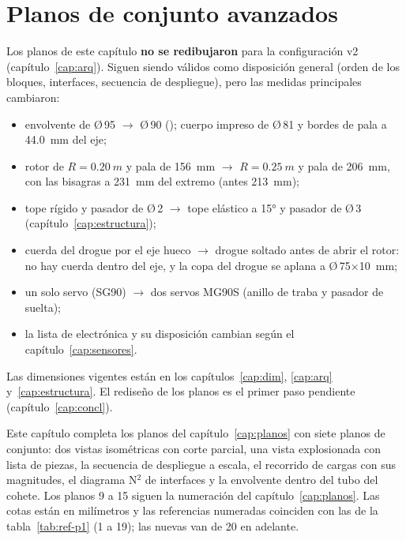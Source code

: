 \chapter{Planos de conjunto avanzados}\label{cap:planos-conjunto}

\begin{nota}
Los planos de este capítulo \textbf{no se redibujaron} para la configuración v2 (capítulo~\ref{cap:arq}). Siguen
siendo válidos como disposición general (orden de los bloques, interfaces, secuencia de
despliegue), pero las medidas principales cambiaron:
\begin{itemize}[leftmargin=*,nosep]
  \item envolvente de Ø\,95 $\to$ Ø\,90 (); cuerpo impreso de Ø\,81 y bordes de pala a \SI{44.0}{mm} del eje;
  \item rotor de $R=\SI{0.20}{m}$ y pala de \SI{156}{mm} $\to$ $R=\SI{0.25}{m}$ y pala de \SI{206}{mm}, con las
        bisagras a \SI{231}{mm} del extremo (antes \SI{213}{mm});
  \item tope rígido y pasador de Ø\,2 $\to$ tope elástico a \ang{+15} y pasador de Ø\,3
        (capítulo~\ref{cap:estructura});
  \item cuerda del drogue por el eje hueco $\to$ drogue soltado antes de abrir el rotor: no hay cuerda
        dentro del eje, y la copa del drogue se aplana a Ø\,75$\times$\SI{10}{mm};
  \item un solo servo (SG90) $\to$ dos servos MG90S (anillo de traba y pasador de suelta);
  \item la lista de electrónica y su disposición cambian según el capítulo~\ref{cap:sensores}.
\end{itemize}
Las dimensiones vigentes están en los capítulos~\ref{cap:dim}, \ref{cap:arq} y~\ref{cap:estructura}. El
rediseño de los planos es el primer paso pendiente (capítulo~\ref{cap:concl}).
\end{nota}

Este capítulo completa los planos del capítulo~\ref{cap:planos} con siete planos de
conjunto: dos vistas isométricas con corte parcial, una vista explosionada con lista de
piezas, la secuencia de despliegue a escala, el recorrido de cargas con sus magnitudes, el
diagrama N$^2$ de interfaces y la envolvente dentro del tubo del cohete. Los planos 9 a 15
siguen la numeración del capítulo~\ref{cap:planos}. Las cotas están en milímetros y las
referencias numeradas coinciden con las de la tabla~\ref{tab:ref-p1} (1 a 19); las nuevas
van de 20 en adelante.

